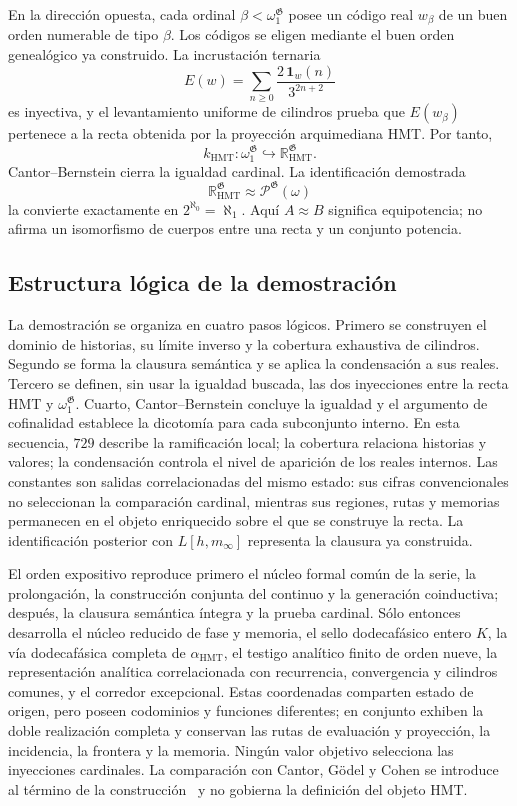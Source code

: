 En la dirección opuesta, cada ordinal
\(\beta<\omega_1^{\mathfrak G}\) posee un código real \(w_\beta\) de un buen
orden numerable de tipo \(\beta\). Los códigos se eligen mediante el buen
orden genealógico ya construido. La incrustación ternaria
\[
 E(w)=\sum_{n\geq0}\frac{2\,\mathbf 1_w(n)}{3^{2n+2}}
\]
es inyectiva, y el levantamiento uniforme de cilindros prueba que
\(E(w_\beta)\) pertenece a la recta obtenida por la proyección arquimediana HMT. Por tanto,
\[
 k_{\mathrm{HMT}}:
 \omega_1^{\mathfrak G}
 \hookrightarrow\mathbb R_{\mathrm{HMT}}^{\mathfrak G}.
\]
Cantor--Bernstein cierra la igualdad cardinal. La identificación demostrada
\[
 \mathbb R_{\mathrm{HMT}}^{\mathfrak G}
 \approx\mathcal P^{\mathfrak G}(\omega)
\]
la convierte exactamente en \(2^{\aleph_0}=\aleph_1\). Aquí
\(A\approx B\) significa equipotencia; no afirma un isomorfismo de cuerpos
entre una recta y un conjunto potencia.

\clearpage
\subsection{Estructura lógica de la demostración}

La demostración se organiza en cuatro pasos lógicos. Primero se construyen el
dominio de historias, su límite inverso y la cobertura exhaustiva de cilindros.
Segundo se forma la clausura semántica y se aplica la condensación a sus reales.
Tercero se definen, sin usar la igualdad buscada, las dos inyecciones entre la
recta HMT y \(\omega_1^{\mathfrak G}\). Cuarto, Cantor--Bernstein concluye la
igualdad y el argumento de cofinalidad establece la dicotomía para cada
subconjunto interno. En esta secuencia, \(729\) describe la ramificación local;
la cobertura relaciona historias y valores; la condensación controla el nivel
de aparición de los reales internos. Las constantes son salidas
correlacionadas del mismo estado: sus cifras convencionales no seleccionan la
comparación cardinal, mientras sus regiones, rutas y memorias permanecen en el
objeto enriquecido sobre el que se construye la recta. La
identificación posterior con \(L[h,m_\infty]\) representa la clausura ya
construida.

El orden expositivo reproduce primero el núcleo formal común de la serie, la
prolongación, la construcción conjunta del continuo y la generación
coinductiva; después, la clausura semántica íntegra y la prueba cardinal. Sólo
entonces desarrolla el núcleo reducido de fase y memoria, el sello
dodecafásico entero \(K\), la vía dodecafásica completa de
\(\alpha_{\mathrm{HMT}}\), el testigo analítico finito de orden nueve, la
representación analítica correlacionada con recurrencia, convergencia y
cilindros comunes, y el corredor excepcional. Estas coordenadas comparten
estado de origen, pero poseen codominios y funciones diferentes; en conjunto
exhiben la doble realización completa y conservan las rutas de evaluación y proyección, la
incidencia, la frontera y la memoria. Ningún valor objetivo selecciona las
inyecciones cardinales. La comparación con Cantor, Gödel y Cohen se introduce
al término de la construcción~\cite{Cantor1878,Hilbert1902,Godel1938,Cohen1963,Cohen1964}
y no gobierna la definición del objeto HMT.

